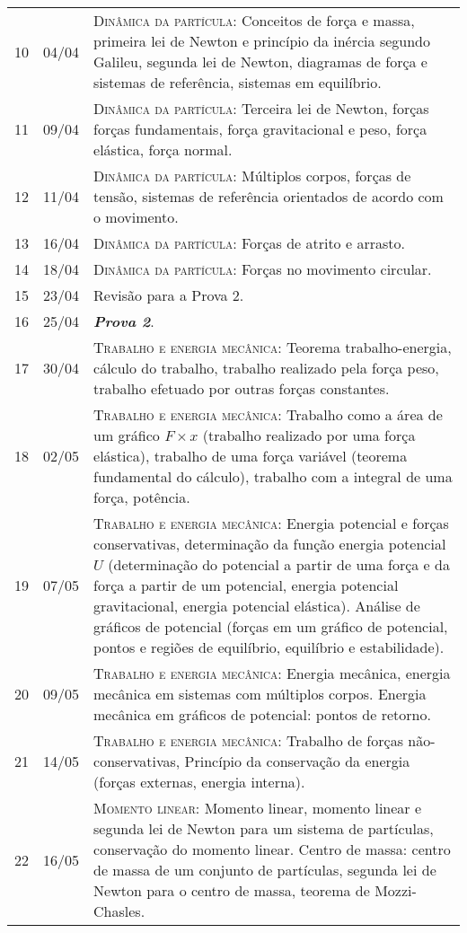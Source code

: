 \begin{center}
\begin{longtable}{ccp{70mm}}
10	 & 	04/04	 & 	\textsc{Dinâmica da partícula:} Conceitos de força e massa, primeira lei de Newton e princípio da inércia segundo Galileu, segunda lei de Newton, diagramas de força e sistemas de referência, sistemas em equilíbrio. \\
11	 & 	09/04	 & 	\textsc{Dinâmica da partícula:} Terceira lei de Newton, forças forças fundamentais, força gravitacional e peso, força elástica, força normal. \\
12	 & 	11/04	 & 	\textsc{Dinâmica da partícula:} Múltiplos corpos, forças de tensão, sistemas de referência orientados de acordo com o movimento. \\
13	 & 	16/04	 & 	\textsc{Dinâmica da partícula:} Forças de atrito e arrasto. \\
14	 & 	18/04	 & 	\textsc{Dinâmica da partícula:} Forças no movimento circular. \\
15	 & 	23/04	 & 	Revisão para a Prova 2. \\
16	 & 	25/04	 & 	\textbf{\textit{Prova 2}}. \\
17	 & 	30/04	 & 	\textsc{Trabalho e energia mecânica:} Teorema trabalho-energia, cálculo do trabalho, trabalho realizado pela força peso, trabalho efetuado por outras forças constantes. \\
18	 & 	02/05	 & 	\textsc{Trabalho e energia mecânica:} Trabalho como a área de um gráfico $F \times x$ (trabalho realizado por uma força elástica), trabalho de uma força variável (teorema fundamental do cálculo), trabalho com a integral de uma força, potência. \\
19	 & 	07/05	 & 	\textsc{Trabalho e energia mecânica:} Energia potencial e forças conservativas, determinação da função energia potencial $U$ (determinação do potencial a partir de uma força e da força a partir de um potencial, energia potencial gravitacional, energia potencial elástica). Análise de gráficos de potencial (forças em um gráfico de potencial, pontos e regiões de equilíbrio, equilíbrio e estabilidade). \\
20	 & 	09/05	 & 	\textsc{Trabalho e energia mecânica:} Energia mecânica, energia mecânica em sistemas com múltiplos corpos. Energia mecânica em gráficos de potencial: pontos de retorno. \\
21	 & 	14/05	 & 	\textsc{Trabalho e energia mecânica:} Trabalho de forças não-conservativas, Princípio da conservação da energia (forças externas, energia interna). \\
22	 & 	16/05	 & 	\textsc{Momento linear:} Momento linear, momento linear e segunda lei de Newton para um sistema de partículas, conservação do momento linear. Centro de massa: centro de massa de um conjunto de partículas, segunda lei de Newton para o centro de massa, teorema de Mozzi-Chasles. \\

\end{longtable}
\end{center}
